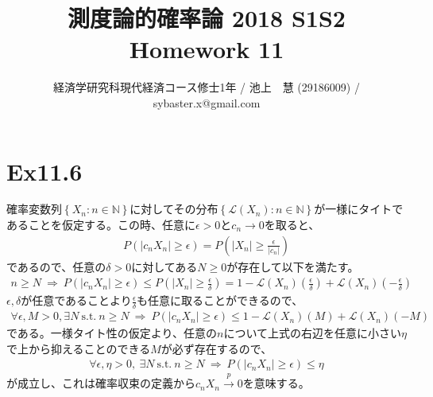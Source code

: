 \documentclass{article}
\begin{document}
\title{測度論的確率論 2018 S1S2 \\ 
Homework 11}
\author{経済学研究科現代経済コース修士1年 / 池上　慧 (29186009) / sybaster.x@gmail.com}
\maketitle


\section{Ex11.6}
確率変数列$\left\{ X_n : n \in \mathbb{N}\right\}$に対してその分布$\left\{ \mathcal{L}(X_n) : n \in \mathbb{N} \right\}$が一様にタイトであることを仮定する。この時、任意に$\epsilon > 0$と$c_n \to 0$を取ると、
\begin{align*}
	P\left( \left| c_n X_n \right| \geq \epsilon \right) = P\left( \left| X_n \right| \geq \frac{\epsilon}{|c_n|} \right)
\end{align*}
であるので、任意の$\delta > 0$に対してある$N \geq 0$が存在して以下を満たす。
\begin{align*}
	n\geq N\ \Rightarrow\ P\left( \left| c_n X_n \right| \geq \epsilon \right) \leq P\left( \left| X_n \right| \geq \frac{\epsilon}{\delta} \right) = 1-\mathcal{L}(X_n)\left( \frac{\epsilon}{\delta} \right) + \mathcal{L}(X_n)\left(- \frac{\epsilon}{\delta} \right)
\end{align*}
$\epsilon, \delta$が任意であることより$\frac{\epsilon}{\delta}$も任意に取ることができるので、
\begin{align*}
	\forall \epsilon,M > 0, \exists N\ \text{s.t.}\ n\geq N\ \Rightarrow\ P\left( \left| c_n X_n \right| \geq \epsilon \right) \leq 1-\mathcal{L}(X_n)\left( M \right) + \mathcal{L}(X_n)\left(-M \right)
\end{align*}
である。一様タイト性の仮定より、任意の$n$について上式の右辺を任意に小さい$\eta$で上から抑えることのできる$M$が必ず存在するので、
\begin{align*}
	\forall \epsilon, \eta > 0,\ \exists N\ \text{s.t.}\ n\geq N\ \Rightarrow\ P\left( \left| c_n X_n \right| \geq \epsilon \right) \leq \eta
\end{align*}
が成立し、これは確率収束の定義から$c_nX_n\xrightarrow{p}0$を意味する。
\end{document}
